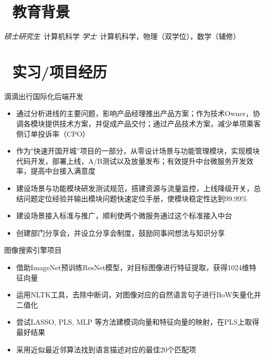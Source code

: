 \documentclass{resume}
\begin{document}


 
\section{\faGraduationCap\  教育背景}
\textit{硕士研究生}\ 计算机科学
\textit{学士}\ 计算机科学，物理（双学位），数学（辅修）

\section{\faUsers\ 实习/项目经历}
\role{软件开发工程师}{工作经历}
滴滴出行国际化后端开发
\begin{itemize}
  \item 通过分析进线的主要问题，影响产品经理推出产品方案；作为技术Owner，协调各模块提供技术方案，并促成产品交付；通过产品技术方案，减少单项乘客侧订单投诉率（CPO）
  \item 作为"快速开国开城”项目的一部分，从零设计场景与功能管理模块，实现模块代码开发，部署上线，A/B测试以及放量发布；有效提升中台微服务开发效率，提高中台接入满意度
  \item 建设场景与功能模块研发测试规范，搭建资源与流量监控，上线降级开关，总结问题定位经验并输出模块问题快速定位手册，使模块稳定性达到99.99\%
  \item 建设场景接入标准与推广，顺利使两个微服务通过这个标准接入中台
  \item 创建部门分享会，并设立分享会制度，鼓励同事间想法与知识分享
\end{itemize}

\begin{onehalfspacing}
图像搜索引擎项目
\begin{itemize}
  \item 借助ImageNet预训练ResNet模型，对目标图像进行特征提取，获得1024维特征向量
  \item 运用NLTK工具，去除中断词，对图像对应的自然语言句子进行BoW矢量化并二值化
  \item 尝试LASSO, PLS, MLP 等方法建模词向量和特征向量的映射，在PLS上取得最好结果
  \item 采用近似最近邻算法找到语言描述对应的最佳20个匹配项
\end{itemize}
\end{onehalfspacing}
\end{document}
